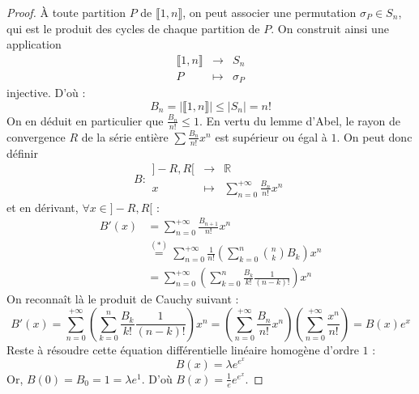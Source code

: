 \begin{proof}
		À toute partition $P$ de $\llbracket 1, n \rrbracket$, on peut associer une permutation $\sigma_P \in S_n$, qui est le produit des cycles de chaque partition de $P$. On construit ainsi une application
		\[
		\begin{array}{ccc}
			\llbracket 1, n \rrbracket &\rightarrow& S_n \\
			P &\mapsto& \sigma_P
		\end{array}
		\]
		injective. D'où :
		\[ B_n = |\llbracket 1, n \rrbracket| \leq |S_n| = n! \]
		On en déduit en particulier que $\frac{B_n}{n!} \leq 1$. En vertu du lemme d'Abel, le rayon de convergence $R$ de la série entière $\sum \frac{B_n}{n!} x^n$ est supérieur ou égal à $1$. On peut donc définir
		\[
		B :
		\begin{array}{ccc}
			]-R,R[ &\rightarrow& \mathbb{R} \\
			x &\mapsto& \sum_{n=0}^{+\infty} \frac{B_n}{n!} x^n
		\end{array}
		\]
		et en dérivant, $\forall x \in ]-R,R[$ :
		\begin{align*}
			B'(x) &= \sum_{n=0}^{+\infty} \frac{B_{n+1}}{n!} x^n \\
			&\overset{(*)}{=} \sum_{n=0}^{+\infty} \frac{1}{n!} \left( \sum_{k=0}^n \binom{n}{k} B_k \right) x^n \\
			&= \sum_{n=0}^{+\infty} \left( \sum_{k=0}^n \frac{B_k}{k!} \frac{1}{(n-k)!} \right) x^n
		\end{align*}
		On reconnaît là le produit de Cauchy suivant :
		\[ B'(x) = \sum_{n=0}^{+\infty} \left( \sum_{k=0}^n \frac{B_k}{k!} \frac{1}{(n-k)!} \right) x^n = \left( \sum_{n=0}^{+\infty} \frac{B_n}{n!} x^n \right) \left( \sum_{n=0}^{+\infty} \frac{x^n}{n!} \right) = B(x) e^x \]
		Reste à résoudre cette équation différentielle linéaire homogène d'ordre $1$ :
		\[ B(x) = \lambda e^{e^x} \]
		Or, $B(0) = B_0 = 1 = \lambda e^1$. D'où $B(x) = \frac{1}{e} e^{e^x}$.


\end{proof}

